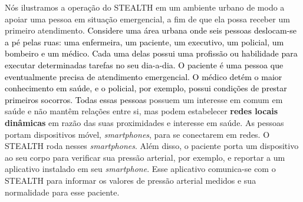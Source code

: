 \documentclass[12pt]{article}
\newcommand{\rev}[1]{\textcolor{black}{{#1}}}
\begin{document}
Nós ilustramos a operação do \mbox{STEALTH} em um ambiente urbano de modo a apoiar uma pessoa em situação emergencial, a fim de que ela possa receber um primeiro atendimento.
 \rev{Considere uma área urbana onde seis pessoas deslocam-se a pé pelas ruas: uma enfermeira, um paciente, um executivo, um policial, um bombeiro e um médico. Cada uma delas possui uma profissão ou habilidade para executar determinadas tarefas no seu dia-a-dia. O paciente é uma pessoa que eventualmente precisa de atendimento emergencial. O médico 
 detém o maior conhecimento em saúde, e o policial, por exemplo, possui condições de prestar primeiros socorros.}
%
\rev{Todas essas pessoas} possuem um interesse em comum em saúde e não mantêm relações entre si, mas podem estabelecer
{\bf redes locais dinâmicas} em razão das suas proximidades e interesse em saúde. 
As pessoas portam dispositivos móvel, \textit{smartphones}, para se conectarem em redes. O \mbox{STEALTH} roda nesses \textit{smartphones}. 
Além disso, o paciente porta um dispositivo ao seu corpo para verificar sua pressão arterial, por exemplo, e reportar a um aplicativo instalado em seu \textit{smartphone}. Esse aplicativo comunica-se com o \mbox{STEALTH} 
para informar 
os valores de pressão arterial medidos e sua normalidade para esse paciente.
\end{document}
